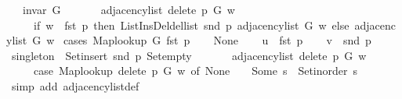 \begin{isabellebody}
\ \ \ {\isachardoublequoteopen}invar\ G{\isachardoublequoteclose}\isanewline
\ \ \isanewline
\ \ \ \ {\isachardoublequoteopen}adjacency{\isacharunderscore}{\kern0pt}list\ {\isacharparenleft}{\kern0pt}delete\ p\ G{\isacharparenright}{\kern0pt}\ w\ {\isacharequal}{\kern0pt}\isanewline
\ \ \ \ \ {\isacharparenleft}{\kern0pt}if\ w\ {\isacharequal}{\kern0pt}\ fst\ p\ then\ List{\isacharunderscore}{\kern0pt}Ins{\isacharunderscore}{\kern0pt}Del{\isachardot}{\kern0pt}del{\isacharunderscore}{\kern0pt}list\ {\isacharparenleft}{\kern0pt}snd\ p{\isacharparenright}{\kern0pt}\ {\isacharparenleft}{\kern0pt}adjacency{\isacharunderscore}{\kern0pt}list\ G\ w{\isacharparenright}{\kern0pt}\ else\ adjacency{\isacharunderscore}{\kern0pt}list\ G\ w{\isacharparenright}{\kern0pt}{\isachardoublequoteclose}\isanewline
%
\isadelimproof
%
\endisadelimproof
%
\isatagproof
{}\isamarkupfalse%
\ {\isacharparenleft}{\kern0pt}cases\ {\isachardoublequoteopen}Map{\isacharunderscore}{\kern0pt}lookup\ G\ {\isacharparenleft}{\kern0pt}fst\ p{\isacharparenright}{\kern0pt}{\isachardoublequoteclose}{\isacharparenright}{\kern0pt}\isanewline
\ \ \isamarkupfalse%
\ None\isanewline
\ \ \isamarkupfalse%
\ {\isacharquery}{\kern0pt}u\ {\isacharequal}{\kern0pt}\ {\isachardoublequoteopen}fst\ p{\isachardoublequoteclose}\isanewline
\ \ \isamarkupfalse%
\ {\isacharquery}{\kern0pt}v\ {\isacharequal}{\kern0pt}\ {\isachardoublequoteopen}snd\ p{\isachardoublequoteclose}\isanewline
\ \ \isamarkupfalse%
\ {\isacharquery}{\kern0pt}singleton\ {\isacharequal}{\kern0pt}\ {\isachardoublequoteopen}Set{\isacharunderscore}{\kern0pt}insert\ {\isacharparenleft}{\kern0pt}snd\ p{\isacharparenright}{\kern0pt}\ Set{\isacharunderscore}{\kern0pt}empty{\isachardoublequoteclose}\isanewline
\ \ \isamarkupfalse%
\isanewline
\ \ \ \ {\isachardoublequoteopen}adjacency{\isacharunderscore}{\kern0pt}list\ {\isacharparenleft}{\kern0pt}delete\ p\ G{\isacharparenright}{\kern0pt}\ w\ {\isacharequal}{\kern0pt}\isanewline
\ \ \ \ \ {\isacharparenleft}{\kern0pt}case\ Map{\isacharunderscore}{\kern0pt}lookup\ {\isacharparenleft}{\kern0pt}delete\ p\ G{\isacharparenright}{\kern0pt}\ w\ of\ None\ {\isasymRightarrow}\ {\isacharbrackleft}{\kern0pt}{\isacharbrackright}{\kern0pt}\ {\isacharbar}{\kern0pt}\ Some\ s\ {\isasymRightarrow}\ Set{\isacharunderscore}{\kern0pt}inorder\ s{\isacharparenright}{\kern0pt}{\isachardoublequoteclose}\isanewline
\ \ \ \ \isamarkupfalse%
\ {\isacharparenleft}{\kern0pt}simp\ add{\isacharcolon}{\kern0pt}\ adjacency{\isacharunderscore}{\kern0pt}list{\isacharunderscore}{\kern0pt}def{\isacharparenright}{\kern0pt}\isanewline

\end{isabellebody}
